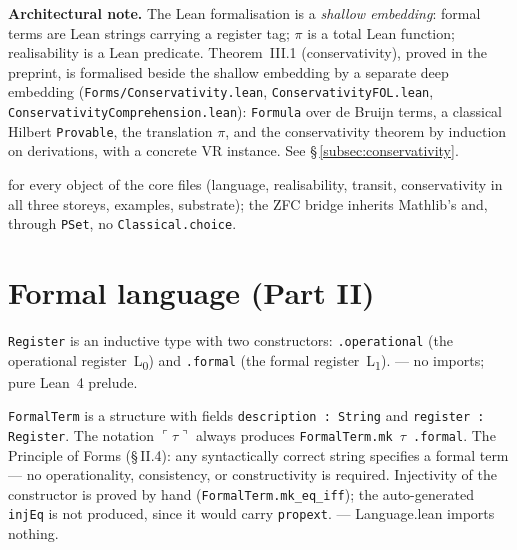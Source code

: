 \textbf{Architectural note.} The Lean formalisation is a \emph{shallow
embedding}: formal terms are Lean strings carrying a register tag; $\pi$ is a
total Lean function; realisability is a Lean predicate.  Theorem~III.1
(conservativity), proved in the preprint, is formalised beside the shallow
embedding by a separate deep embedding
(\texttt{Forms/Conservativity.lean}, \texttt{ConservativityFOL.lean},
\texttt{ConservativityComprehension.lean}): \texttt{Formula} over de Bruijn
terms, a classical Hilbert \texttt{Provable}, the translation $\pi$, and the
conservativity theorem by induction on derivations, with a concrete VR
instance.  See \S\,\ref{subsec:conservativity}.

\noindent\axiomprofile{[]} for every object of the core files (language,
realisability, transit, conservativity in all three storeys, examples,
substrate); the ZFC bridge inherits Mathlib's
 and, through \texttt{PSet}, no
\texttt{Classical.choice}.

\section{Formal language (Part II)}
\label{sec:forms_language}

\begin{definition}
\label{def:Register}
\leanok
\texttt{Register} is an inductive type with two constructors:
\texttt{.operational} (the operational register~L\textsubscript{0}) and
\texttt{.formal} (the formal register~L\textsubscript{1}).
\axiomprofile{[]} --- no imports; pure Lean~4 prelude.
\end{definition}

\begin{definition}
\label{def:FormalTerm}
\leanok
{}
\texttt{FormalTerm} is a structure with fields \texttt{description :
String} and \texttt{register : Register}.  The notation
$\ulcorner\tau\urcorner$ always produces
\texttt{FormalTerm.mk\,$\tau$\,.formal}.  The Principle of Forms (§\,II.4):
any syntactically correct string specifies a formal term --- no
operationality, consistency, or constructivity is required.
Injectivity of the constructor is proved by hand
(\texttt{FormalTerm.mk\_eq\_iff}); the auto-generated \texttt{injEq} is
not produced, since it would carry \texttt{propext}.
\axiomprofile{[]} --- Language.lean imports nothing.
\end{definition}

